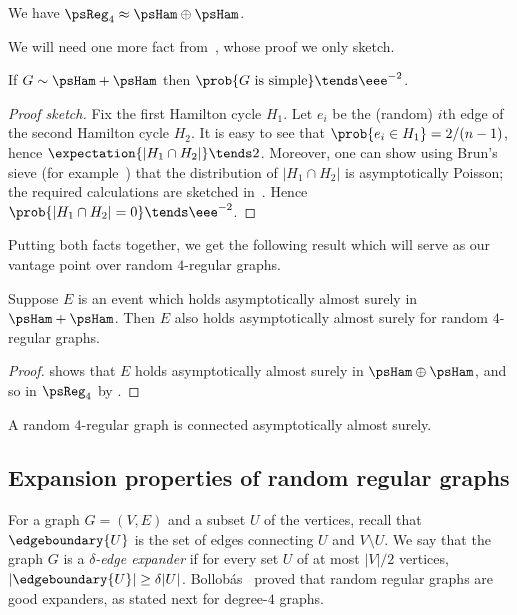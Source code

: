 \documentclass{toc}
\begin{document}
\begin{theorem} \label{thm:kim-wormald}
 We have $\psReg_4 \approx \psHam \oplus \psHam$.
\end{theorem}

We will need one more fact from~\cite{KW}, whose proof we only sketch.

\begin{lemma} \label{lem:ham}
 If $G \sim \psHam + \psHam$ then $\prob{G \text{ is simple}} \tends \eee^{-2}$.
\end{lemma}
\begin{proof}[Proof sketch]
 Fix the first Hamilton cycle $H_1$. Let $e_i$ be the (random) $i$th edge of the second Hamilton cycle $H_2$. It is easy to see that $\prob{e_i \in H_1} = 2/(n-1)$, hence $\expectation{|H_1 \cap H_2|} \tends 2$. Moreover, one can show using Brun's sieve (for example~\cite[Theorem 8.3.1]{AS}) that the distribution of $|H_1 \cap H_2|$ is asymptotically Poisson; the required calculations are sketched in~\cite[\S 2(iii)]{KW}. Hence $\prob{|H_1 \cap H_2| = 0} \tends \eee^{-2}$.
\end{proof}

Putting both facts together, we get the following result which will serve as our vantage point over random $4$-regular graphs.

\begin{lemma} \label{lem:model}
 Suppose $E$ is an event which holds asymptotically almost surely in $\psHam + \psHam$. Then $E$ also holds asymptotically almost surely for random $4$-regular graphs.
\end{lemma}
\begin{proof}
  shows that $E$ holds asymptotically almost surely in $\psHam \oplus \psHam$, and so in $\psReg_4$ by .
\end{proof}

\begin{corollary} \label{cor:connected}
 A random $4$-regular graph is connected asymptotically almost surely.
\end{corollary}

\subsection{Expansion properties of random regular graphs}

For a graph $G=(V,E)$ and a subset $U$ of the vertices, recall that $\edgeboundary{U}$ is the set of edges connecting $U$ and $V \setminus U$. We say that the graph $G$ is a \emph{$\delta$-edge expander} if for every set $U$ of at most $|V|/2$ vertices, $|\edgeboundary{U}| \geq \delta |U|$. Bollob\'as~\cite{Bollobas88Isoperimetric} proved that random regular graphs are good expanders, as stated next for degree-$4$ graphs.
\end{document}
